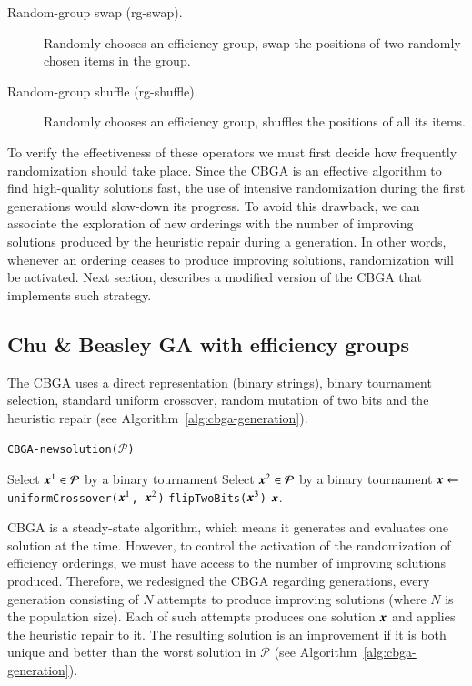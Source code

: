 \documentclass[3p,authoryear]{elsarticle}
\begin{document}
\begin{description}
\item[Random-group swap ({\sc rg-swap}).] Randomly chooses an efficiency group, swap the positions of two randomly chosen items in the group.
\item[Random-group shuffle ({\sc rg-shuffle}).] Randomly chooses an efficiency group, shuffles the positions of all its items.
\end{description}

To verify the effectiveness of these operators we must first decide how frequently randomization should take place. Since the \gls{CBGA} is an effective algorithm to find high-quality solutions fast, the use of intensive randomization during the first generations would slow-down its progress. To avoid this drawback, we can associate the exploration of new orderings with the number of improving solutions produced by the heuristic repair during a generation. In other words, whenever an ordering ceases to produce improving solutions, randomization will be activated. Next section, describes a modified version of the \gls{CBGA} that implements such strategy.

%
%
%
%
%
%
\subsection{Chu \& Beasley GA with efficiency groups}\label{sec:cbga}
\newcommand{\p}{\mathcal{P}}
The \gls{CBGA} uses a direct representation (binary strings), binary tournament selection, standard uniform crossover, random mutation of two bits and the heuristic repair (see Algorithm~\ref{alg:cbga-generation}).  

\begin{algorithm}[h!t]
	\caption{{\tt CBGA-newsolution($\p$)}}
	\label{alg:cbga-newsolution}
	\begin{algorithmic}[1]
	   \State Select $\x^1\in\p$ by a binary tournament 
	  \State Select $\x^2\in\p$ by a binary tournament 
	   \State $\boldsymbol{x}\leftarrow$ \texttt{uniformCrossover($\boldsymbol{x}^1$, $\boldsymbol{x}^2$)}
	   \State \texttt{flipTwoBits($\boldsymbol{x}^3$)}
		\State \Return $\boldsymbol{x}$.		
	\end{algorithmic}
\end{algorithm}

\gls{CBGA} is a steady-state algorithm, which means it generates and evaluates one solution at the time. However, to control the activation of the randomization of efficiency orderings, we must have access to the number of improving solutions produced. Therefore, we redesigned the \gls{CBGA} regarding generations, every generation consisting of $N$ attempts to produce improving solutions (where $N$ is the population size). Each of such attempts produces one solution $\boldsymbol{x}$ and applies the heuristic repair to it. The resulting solution is an improvement if it is both unique and better than the worst solution in $\p$ (see Algorithm~\ref{alg:cbga-generation}).
\end{document}
